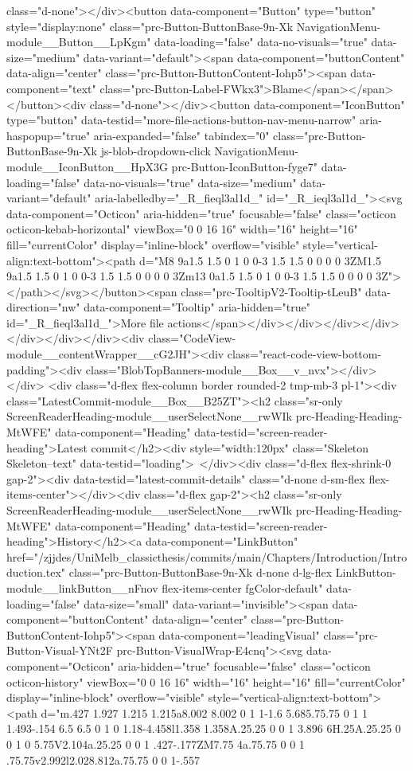 {{{{{class="d-none"></div><button data-component="Button" type="button" style="display:none" class="prc-Button-ButtonBase-9n-Xk NavigationMenu-module__Button__LpKgm" data-loading="false" data-no-visuals="true" data-size="medium" data-variant="default"><span data-component="buttonContent" data-align="center" class="prc-Button-ButtonContent-Iohp5"><span data-component="text" class="prc-Button-Label-FWkx3">Blame</span></span></button><div class="d-none"></div><button data-component="IconButton" type="button" data-testid="more-file-actions-button-nav-menu-narrow" aria-haspopup="true" aria-expanded="false" tabindex="0" class="prc-Button-ButtonBase-9n-Xk js-blob-dropdown-click NavigationMenu-module__IconButton__HpX3G prc-Button-IconButton-fyge7" data-loading="false" data-no-visuals="true" data-size="medium" data-variant="default" aria-labelledby="_R_fieql3al1d_" id="_R_ieql3al1d_"><svg data-component="Octicon" aria-hidden="true" focusable="false" class="octicon octicon-kebab-horizontal" viewBox="0 0 16 16" width="16" height="16" fill="currentColor" display="inline-block" overflow="visible" style="vertical-align:text-bottom"><path d="M8 9a1.5 1.5 0 1 0 0-3 1.5 1.5 0 0 0 0 3ZM1.5 9a1.5 1.5 0 1 0 0-3 1.5 1.5 0 0 0 0 3Zm13 0a1.5 1.5 0 1 0 0-3 1.5 1.5 0 0 0 0 3Z"></path></svg></button><span class="prc-TooltipV2-Tooltip-tLeuB" data-direction="nw" data-component="Tooltip" aria-hidden="true" id="_R_fieql3al1d_">More file actions</span></div></div></div></div></div></div></div><div class="CodeView-module__contentWrapper__cG2JH"><div class="react-code-view-bottom-padding"><div class="BlobTopBanners-module__Box__v_nvx"></div></div> <div class="d-flex flex-column border rounded-2 tmp-mb-3 pl-1"><div class="LatestCommit-module__Box__B25ZT"><h2 class="sr-only ScreenReaderHeading-module__userSelectNone__rwWIk prc-Heading-Heading-MtWFE" data-component="Heading" data-testid="screen-reader-heading">Latest commit</h2><div style="width:120px" class="Skeleton Skeleton--text" data-testid="loading"> </div><div class="d-flex flex-shrink-0 gap-2"><div data-testid="latest-commit-details" class="d-none d-sm-flex flex-items-center"></div><div class="d-flex gap-2"><h2 class="sr-only ScreenReaderHeading-module__userSelectNone__rwWIk prc-Heading-Heading-MtWFE" data-component="Heading" data-testid="screen-reader-heading">History</h2><a data-component="LinkButton" href="/zjjdes/UniMelb_classicthesis/commits/main/Chapters/Introduction/Introduction.tex" class="prc-Button-ButtonBase-9n-Xk d-none d-lg-flex LinkButton-module__linkButton__nFnov flex-items-center fgColor-default" data-loading="false" data-size="small" data-variant="invisible"><span data-component="buttonContent" data-align="center" class="prc-Button-ButtonContent-Iohp5"><span data-component="leadingVisual" class="prc-Button-Visual-YNt2F prc-Button-VisualWrap-E4cnq"><svg data-component="Octicon" aria-hidden="true" focusable="false" class="octicon octicon-history" viewBox="0 0 16 16" width="16" height="16" fill="currentColor" display="inline-block" overflow="visible" style="vertical-align:text-bottom"><path d="m.427 1.927 1.215 1.215a8.002 8.002 0 1 1-1.6 5.685.75.75 0 1 1 1.493-.154 6.5 6.5 0 1 0 1.18-4.458l1.358 1.358A.25.25 0 0 1 3.896 6H.25A.25.25 0 0 1 0 5.75V2.104a.25.25 0 0 1 .427-.177ZM7.75 4a.75.75 0 0 1 .75.75v2.992l2.028.812a.75.75 0 0 1-.557 }}}}}
